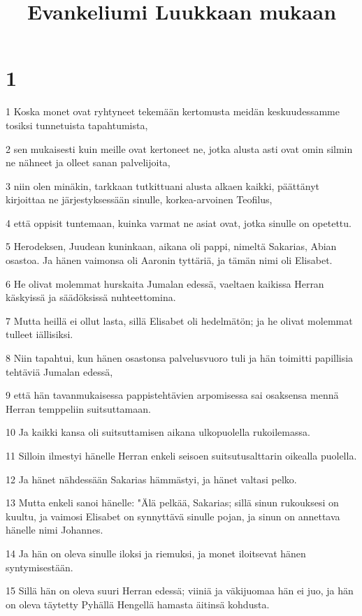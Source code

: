 

\title{Evankeliumi Luukkaan mukaan}


\chapter{1}

\par 1 Koska monet ovat ryhtyneet tekemään kertomusta meidän keskuudessamme tosiksi tunnetuista tapahtumista,
\par 2 sen mukaisesti kuin meille ovat kertoneet ne, jotka alusta asti ovat omin silmin ne nähneet ja olleet sanan palvelijoita,
\par 3 niin olen minäkin, tarkkaan tutkittuani alusta alkaen kaikki, päättänyt kirjoittaa ne järjestyksessään sinulle, korkea-arvoinen Teofilus,
\par 4 että oppisit tuntemaan, kuinka varmat ne asiat ovat, jotka sinulle on opetettu.
\par 5 Herodeksen, Juudean kuninkaan, aikana oli pappi, nimeltä Sakarias, Abian osastoa. Ja hänen vaimonsa oli Aaronin tyttäriä, ja tämän nimi oli Elisabet.
\par 6 He olivat molemmat hurskaita Jumalan edessä, vaeltaen kaikissa Herran käskyissä ja säädöksissä nuhteettomina.
\par 7 Mutta heillä ei ollut lasta, sillä Elisabet oli hedelmätön; ja he olivat molemmat tulleet iällisiksi.
\par 8 Niin tapahtui, kun hänen osastonsa palvelusvuoro tuli ja hän toimitti papillisia tehtäviä Jumalan edessä,
\par 9 että hän tavanmukaisessa pappistehtävien arpomisessa sai osaksensa mennä Herran temppeliin suitsuttamaan.
\par 10 Ja kaikki kansa oli suitsuttamisen aikana ulkopuolella rukoilemassa.
\par 11 Silloin ilmestyi hänelle Herran enkeli seisoen suitsutusalttarin oikealla puolella.
\par 12 Ja hänet nähdessään Sakarias hämmästyi, ja hänet valtasi pelko.
\par 13 Mutta enkeli sanoi hänelle: "Älä pelkää, Sakarias; sillä sinun rukouksesi on kuultu, ja vaimosi Elisabet on synnyttävä sinulle pojan, ja sinun on annettava hänelle nimi Johannes.
\par 14 Ja hän on oleva sinulle iloksi ja riemuksi, ja monet iloitsevat hänen syntymisestään.
\par 15 Sillä hän on oleva suuri Herran edessä; viiniä ja väkijuomaa hän ei juo, ja hän on oleva täytetty Pyhällä Hengellä hamasta äitinsä kohdusta.
